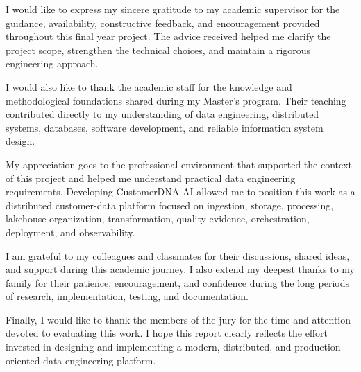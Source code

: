 I would like to express my sincere gratitude to my academic supervisor for the guidance, availability, constructive feedback, and encouragement provided throughout this final year project. The advice received helped me clarify the project scope, strengthen the technical choices, and maintain a rigorous engineering approach.

I would also like to thank the academic staff for the knowledge and methodological foundations shared during my Master's program. Their teaching contributed directly to my understanding of data engineering, distributed systems, databases, software development, and reliable information system design.

My appreciation goes to the professional environment that supported the context of this project and helped me understand practical data engineering requirements. Developing CustomerDNA AI allowed me to position this work as a distributed customer-data platform focused on ingestion, storage, processing, lakehouse organization, transformation, quality evidence, orchestration, deployment, and observability.

I am grateful to my colleagues and classmates for their discussions, shared ideas, and support during this academic journey. I also extend my deepest thanks to my family for their patience, encouragement, and confidence during the long periods of research, implementation, testing, and documentation.

Finally, I would like to thank the members of the jury for the time and attention devoted to evaluating this work. I hope this report clearly reflects the effort invested in designing and implementing a modern, distributed, and production-oriented data engineering platform.